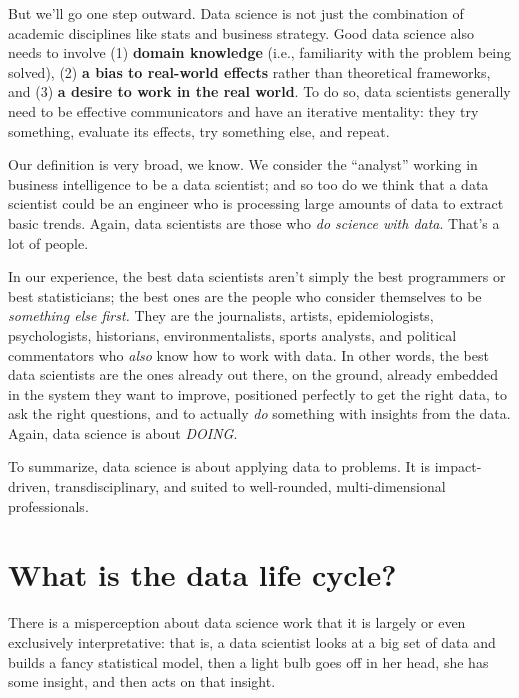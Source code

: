 \documentclass[]{book}
\begin{document}
But we'll go one step outward. Data science is not just the combination of academic disciplines like stats and business strategy. Good data science also needs to involve (1) \textbf{domain knowledge} (i.e., familiarity with the problem being solved), (2) \textbf{a bias to real-world effects} rather than theoretical frameworks, and (3) \textbf{a desire to work in the real world}. To do so, data scientists generally need to be effective communicators and have an iterative mentality: they try something, evaluate its effects, try something else, and repeat.

Our definition is very broad, we know. We consider the ``analyst'' working in business intelligence to be a data scientist; and so too do we think that a data scientist could be an engineer who is processing large amounts of data to extract basic trends. Again, data scientists are those who \emph{do science with data}. That's a lot of people.

In our experience, the best data scientists aren't simply the best programmers or best statisticians; the best ones are the people who consider themselves to be \emph{something else first.} They are the journalists, artists, epidemiologists, psychologists, historians, environmentalists, sports analysts, and political commentators who \emph{also} know how to work with data. In other words, the best data scientists are the ones already out there, on the ground, already embedded in the system they want to improve, positioned perfectly to get the right data, to ask the right questions, and to actually \emph{do} something with insights from the data. Again, data science is about \emph{DOING}.

To summarize, data science is about applying data to problems. It is impact-driven, transdisciplinary, and suited to well-rounded, multi-dimensional professionals.

\hypertarget{what-is-the-data-life-cycle}{%
\section*{What is the data life cycle?}\label{what-is-the-data-life-cycle}}

There is a misperception about data science work that it is largely or even exclusively interpretative: that is, a data scientist looks at a big set of data and builds a fancy statistical model, then a light bulb goes off in her head, she has some insight, and then acts on that insight.
\end{document}
